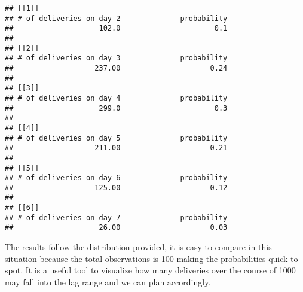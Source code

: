 \documentclass[]{article}
\begin{document}
\begin{verbatim}
## [[1]]
## # of deliveries on day 2              probability 
##                    102.0                      0.1 
## 
## [[2]]
## # of deliveries on day 3              probability 
##                   237.00                     0.24 
## 
## [[3]]
## # of deliveries on day 4              probability 
##                    299.0                      0.3 
## 
## [[4]]
## # of deliveries on day 5              probability 
##                   211.00                     0.21 
## 
## [[5]]
## # of deliveries on day 6              probability 
##                   125.00                     0.12 
## 
## [[6]]
## # of deliveries on day 7              probability 
##                    26.00                     0.03
\end{verbatim}

The results follow the distribution provided, it is easy to compare in
this situation because the total observations is 100 making the
probabilities quick to spot. It is a useful tool to visualize how many
deliveries over the course of 1000 may fall into the lag range and we
can plan accordingly.
\end{document}
